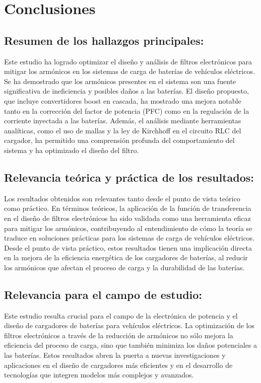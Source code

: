 \section{Conclusiones}

\subsection{Resumen de los hallazgos principales:}
Este estudio ha logrado optimizar el diseño y análisis de filtros electrónicos para mitigar los armónicos en los sistemas de carga de baterías de vehículos eléctricos. Se ha demostrado que los armónicos presentes en el sistema son una fuente significativa de ineficiencia y posibles daños a las baterías. El diseño propuesto, que incluye convertidores boost en cascada, ha mostrado una mejora notable tanto en la corrección del factor de potencia (PFC) como en la regulación de la corriente inyectada a las baterías. Además, el análisis mediante herramientas analíticas, como el uso de mallas y la ley de Kirchhoff en el circuito RLC del cargador, ha permitido una comprensión profunda del comportamiento del sistema y ha optimizado el diseño del filtro.

\subsection{Relevancia teórica y práctica de los resultados:}
Los resultados obtenidos son relevantes tanto desde el punto de vista teórico como práctico. En términos teóricos, la aplicación de la función de transferencia en el diseño de filtros electrónicos ha sido validada como una herramienta eficaz para mitigar los armónicos, contribuyendo al entendimiento de cómo la teoría se traduce en soluciones prácticas para los sistemas de carga de vehículos eléctricos. Desde el punto de vista práctico, estos resultados tienen una implicación directa en la mejora de la eficiencia energética de los cargadores de baterías, al reducir los armónicos que afectan el proceso de carga y la durabilidad de las baterías.

\subsection{Relevancia para el campo de estudio:}
Este estudio resulta crucial para el campo de la electrónica de potencia y el diseño de
cargadores de baterías para vehículos eléctricos. La optimización de los filtros electrónicos a
través de la reducción de armónicos no sólo mejora la eficiencia del proceso de carga, sino
que también minimiza los daños potenciales a las baterías. Estos resultados abren la puerta a
nuevas investigaciones y aplicaciones en el diseño de cargadores más eficientes y en el
desarrollo de tecnologías que integren modelos más complejos y avanzados.

